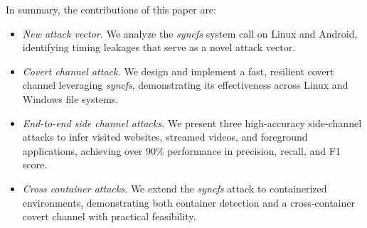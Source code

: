 In summary, the contributions of this paper are: 
\begin{itemize}
    \item \textit{New attack vector.} We analyze the \textit{syncfs} system call on Linux and Android, identifying timing leakages that serve as a novel attack vector.
    \item \textit{Covert channel attack.} We design and implement a fast, resilient covert channel leveraging \textit{syncfs}, demonstrating its effectiveness across Linux and Windows file systems.
    \item \textit{End-to-end side channel attacks.} We present three high-accuracy side-channel attacks to infer visited websites, streamed videos, and foreground applications, achieving over 90\% performance in precision, recall, and F1 score.
    \item \textit{Cross container attacks.} We extend the \textit{syncfs} attack to containerized environments, demonstrating both container detection and a cross-container covert channel with practical feasibility.
    
\end{itemize}



